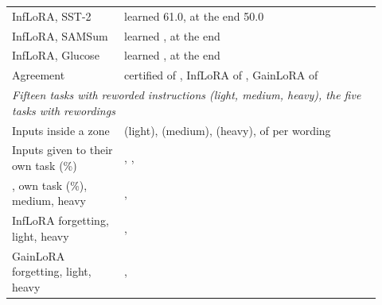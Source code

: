 \begin{table}[!htbp]
\begin{tabular}{p{0.28\linewidth}p{0.64\linewidth}}
    InfLoRA, SST-2 & learned 61.0, at the end 50.0\\
    InfLoRA, SAMSum & learned \FifteenInfSamsumLearned{}, at the end \FifteenInfSamsumEnd{}\\
    InfLoRA, Glucose & learned \FifteenInfGlucoseLearned{}, at the end \FifteenInfGlucoseEnd{}\\
    Agreement & certified \FifteenCertSame{} of \FifteenCertSameOf{}, InfLoRA \FifteenInfSame{} of \FifteenInfSameOf{}, GainLoRA \FifteenGainSame{} of \FifteenGainSameOf{}\\
    \midrule
    \multicolumn{2}{l}{\textit{Fifteen tasks with reworded instructions (light, medium, heavy), the five tasks with rewordings}}\\
    Inputs inside a zone & \FifteenCertZoneOneLight{} (light), \FifteenCertZoneOneMedium{} (medium), \FifteenCertZoneOneHeavy{} (heavy), of \FifteenCertInputsOneMedium{} per wording\\
    Inputs given to their own task (\%) & \FifteenCertRightLight{}, \FifteenCertRightMedium{}, \FifteenCertRightHeavy{}\\
    \centre{}, own task (\%), medium, heavy & \FifteenCentreRightMedium{}, \FifteenCentreRightHeavy{}\\
    InfLoRA forgetting, light, heavy & \FifteenInfFTLight{}, \FifteenInfFTHeavy{}\\
    GainLoRA forgetting, light, heavy & \FifteenGainFTLight{}, \FifteenGainFTHeavy{}\\
    \bottomrule
  \end{tabular}
\end{table}
